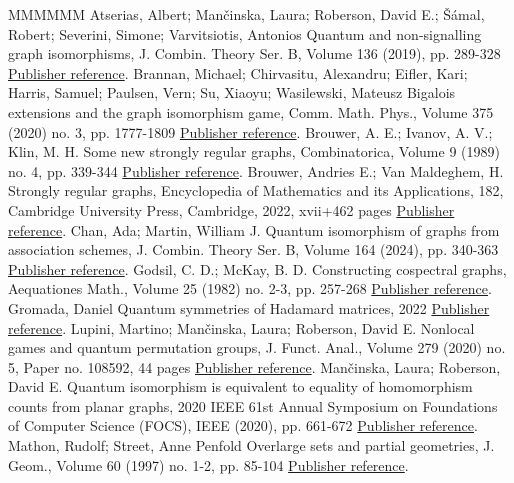 \documentclass[11pt]{article}
\theoremstyle{definition}
\numberwithin{equation}{section}
\begin{document}
\begin{thebibliography}{MMMMMM}
 Atserias, Albert; Mančinska, Laura; Roberson, David E.; Šámal, Robert; Severini, Simone; Varvitsiotis, Antonios Quantum and non-signalling graph isomorphisms, J. Combin. Theory Ser. B, Volume 136 (2019), pp. 289-328 \href{https://alco.centre-mersenne.org/articles/10.5802/alco.335/#AMRSSV}{Publisher reference}.
 Brannan, Michael; Chirvasitu, Alexandru; Eifler, Kari; Harris, Samuel; Paulsen, Vern; Su, Xiaoyu; Wasilewski, Mateusz Bigalois extensions and the graph isomorphism game, Comm. Math. Phys., Volume 375 (2020) no. 3, pp. 1777-1809 \href{https://alco.centre-mersenne.org/articles/10.5802/alco.335/#BCEHPSW}{Publisher reference}.
 Brouwer, A. E.; Ivanov, A. V.; Klin, M. H. Some new strongly regular graphs, Combinatorica, Volume 9 (1989) no. 4, pp. 339-344 \href{https://alco.centre-mersenne.org/articles/10.5802/alco.335/#BIK}{Publisher reference}.
 Brouwer, Andries E.; Van Maldeghem, H. Strongly regular graphs, Encyclopedia of Mathematics and its Applications, 182, Cambridge University Press, Cambridge, 2022, xvii+462 pages \href{https://alco.centre-mersenne.org/articles/10.5802/alco.335/#BVM}{Publisher reference}.
 Chan, Ada; Martin, William J. Quantum isomorphism of graphs from association schemes, J. Combin. Theory Ser. B, Volume 164 (2024), pp. 340-363 \href{https://alco.centre-mersenne.org/articles/10.5802/alco.335/#CM}{Publisher reference}.
 Godsil, C. D.; McKay, B. D. Constructing cospectral graphs, Aequationes Math., Volume 25 (1982) no. 2-3, pp. 257-268 \href{https://alco.centre-mersenne.org/articles/10.5802/alco.335/#GM}{Publisher reference}.
 Gromada, Daniel Quantum symmetries of Hadamard matrices, 2022 \href{https://alco.centre-mersenne.org/articles/10.5802/alco.335/#G}{Publisher reference}.
 Lupini, Martino; Mančinska, Laura; Roberson, David E. Nonlocal games and quantum permutation groups, J. Funct. Anal., Volume 279 (2020) no. 5, Paper no. 108592, 44 pages \href{https://alco.centre-mersenne.org/articles/10.5802/alco.335/#LMR}{Publisher reference}.
 Mančinska, Laura; Roberson, David E. Quantum isomorphism is equivalent to equality of homomorphism counts from planar graphs, 2020 IEEE 61st Annual Symposium on Foundations of Computer Science (FOCS), IEEE (2020), pp. 661-672 \href{https://alco.centre-mersenne.org/articles/10.5802/alco.335/#MRplanar}{Publisher reference}.
 Mathon, Rudolf; Street, Anne Penfold Overlarge sets and partial geometries, J. Geom., Volume 60 (1997) no. 1-2, pp. 85-104 \href{https://alco.centre-mersenne.org/articles/10.5802/alco.335/#MS}{Publisher reference}.

\end{thebibliography}
\end{document}
